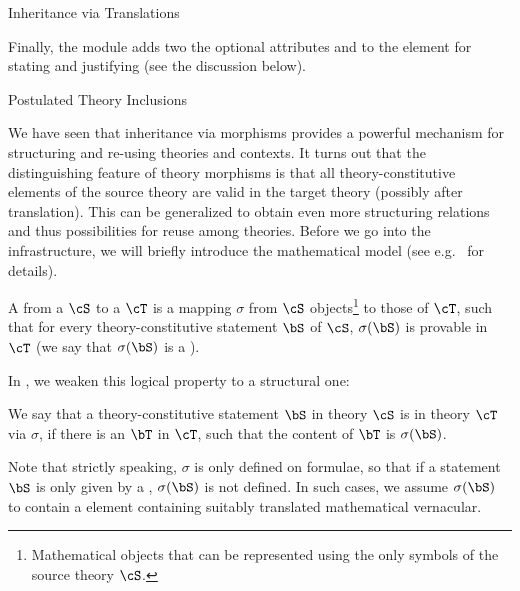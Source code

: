 \begin{omgroup}[id=complex-theories,short=Complex Theories,
                            creators=miko,contributors=frabe]
\begin{omgroup}[id=morphisms]{Inheritance via Translations}
\begin{module}[id=morphisms]
Finally, the {} module adds two the optional attributes
{} and {} to
the {} element for stating and justifying {}
(see the discussion below).
\end{module}
\end{omgroup}

\begin{omgroup}[id=theory-inclusions]{Postulated Theory Inclusions}
\begin{module}[id=theory-morphisms]

We have seen that inheritance via morphisms provides a powerful mechanism for structuring
and re-using theories and contexts. It turns out that the distinguishing feature of theory
morphisms is that all theory-constitutive elements of the source theory are valid in the
target theory (possibly after translation). This can be generalized to obtain even more
structuring relations and thus possibilities for reuse among theories. Before we go into
the {\omdoc} infrastructure, we will briefly introduce the mathematical model (see
e.g.~\cite{Hutter:mocsv00} for details).

\begin{definition}[display=flow,id=theory-inclusion.def]
  A {} from a {} $\cS$ to a
  {} $\cT$ is a mapping $\sigma$ from $\cS$
  objects\footnote{Mathematical objects that can be represented using the only symbols of
    the source theory $\cS$.} to those of $\cT$, such that for every theory-constitutive
  statement $\bS$ of $\cS$, $\sigma(\bS)$ is provable in $\cT$ (we say that $\sigma(\bS)$
  is a {}).
\end{definition}   

In {\omdoc}, we weaken this logical property to a structural one: 
\begin{definition}[id=structurally-included.def,display=flow]
  We say that a theory-constitutive statement $\bS$ in theory $\cS$ is
  {} in theory $\cT$ via $\sigma$, if there is an
   $\bT$ in $\cT$, such that the content of $\bT$ is
  $\sigma(\bS)$.
\end{definition}
Note that strictly speaking, $\sigma$ is only defined on formulae, so that if a statement
$\bS$ is only given by a {}, $\sigma(\bS)$ is not defined. In such cases, we
assume $\sigma(\bS)$ to contain a {} element containing suitably translated
mathematical vernacular.


\end{module}
\end{omgroup}
\end{omgroup}
